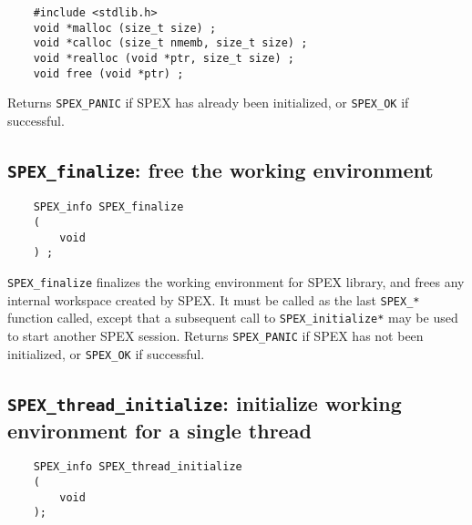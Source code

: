\documentclass[12pt,oneside]{book}
\theoremstyle{definition}
\begin{document}
\begin{mdframed}[userdefinedwidth=\textwidth]
{\footnotesize
\begin{verbatim}
    #include <stdlib.h>
    void *malloc (size_t size) ;
    void *calloc (size_t nmemb, size_t size) ;
    void *realloc (void *ptr, size_t size) ;
    void free (void *ptr) ;
\end{verbatim}
} \end{mdframed}

Returns \verb|SPEX_PANIC| if SPEX has already been initialized,
or \verb|SPEX_OK| if successful.


\subsection{\texttt{SPEX\_finalize}: free the working environment} \label{ss:SPEX_finalize}
\begin{mdframed}[userdefinedwidth=\textwidth]
{\footnotesize
\begin{verbatim}
    SPEX_info SPEX_finalize
    (
        void
    ) ;
\end{verbatim}
} \end{mdframed}

\verb|SPEX_finalize| finalizes the working environment for SPEX
library, and frees any internal workspace created by SPEX.  It must be
called as the last \verb|SPEX_*| function called, except that a subsequent
call to \verb|SPEX_initialize*| may be used to start another SPEX session.
Returns \verb|SPEX_PANIC| if SPEX has not been initialized,
or \verb|SPEX_OK| if successful.

\subsection{\texttt{SPEX\_thread\_initialize}: initialize working environment for a single thread}

\begin{mdframed}[userdefinedwidth=\textwidth]
{\footnotesize
\begin{verbatim}
    SPEX_info SPEX_thread_initialize 
    ( 
        void 
    );
\end{verbatim}
} \end{mdframed}
\end{document}
